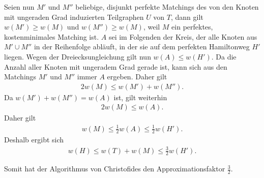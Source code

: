 Seien nun $M'$ und $M''$ beliebige, disjunkt perfekte Matchings des von den Knoten mit ungeraden Grad induzierten Teilgraphen $U$ von $T$, dann gilt $w(M')\geq w(M)$ und $w(M'')\geq w(M)$, weil $M$ ein perfektes, kostenminimales Matching ist. $A$ sei im Folgenden der Kreis, der alle Knoten aus $M'\cup M''$ in der Reihenfolge abläuft, in der sie auf dem perfekten Hamiltonweg $H'$ liegen. Wegen der Dreiecksungleichung gilt nun $w(A)\leq w(H')$. Da die Anzahl aller Knoten mit ungeradem Grad gerade ist, kann sich aus den Matchings $M'$ und $M''$ immer $A$ ergeben. Daher gilt 
\begin{align*}
2 w(M)\leq w(M')+w(M'').
\end{align*}
 Da $w(M')+w(M'')=w(A)$ ist, gilt weiterhin
\begin{align*} 
2 w(M)\leq w(A).
\end{align*}
 Daher gilt 
\begin{align*}
w(M)\leq \frac{1}{2} w(A)\leq \frac{1}{2} w(H').
\end{align*}
 Deshalb ergibt sich
\begin{align*}
w(H)\leq w(T)+w(M)\leq \frac{3}{2} w(H').
\end{align*}

Somit hat der Algorithmus von Christofides den Approximationsfaktor $\frac{3}{2}$.
